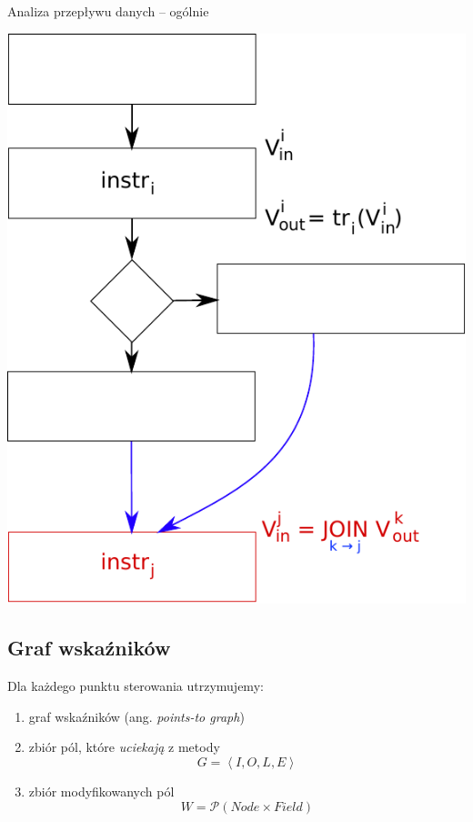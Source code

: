 \documentclass[handout]{beamer}
\begin{document}
\begin{frame}{Analiza przepływu danych -- ogólnie}
\begin{center}
  \includegraphics[scale=0.55]{img/dataflow-2.pdf}  
\end{center}
\end{frame}

\subsection{Graf wskaźników}

\begin{frame}
  Dla każdego punktu sterowania utrzymujemy:
  \begin{enumerate}
  \item<1-> graf wskaźników (ang. \emph{points-to graph})
  \item<1-> zbiór pól, które \emph{uciekają} z metody
      $$G = \left<I, O, L, E\right>$$
  \item<2-> zbiór modyfikowanych pól
    $$W = \mathcal{P}\left(Node \times Field\right)$$
  \end{enumerate}
\end{frame}
\end{document}
